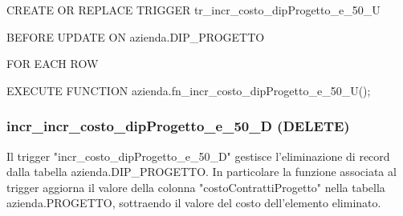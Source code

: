     \ttfamily
        \begin{flushleft}
            \begin{description}
                \item CREATE OR REPLACE TRIGGER tr\_incr\_costo\_dipProgetto\_e\_50\_U
                \item BEFORE UPDATE ON azienda.DIP\_PROGETTO
                \item FOR EACH ROW
                \item EXECUTE FUNCTION azienda.fn\_incr\_costo\_dipProgetto\_e\_50\_U();
            \end{description}
        \end{flushleft}
    \normalfont


    \subsubsection{incr\_incr\_costo\_dipProgetto\_e\_50\_D (DELETE)}
    Il trigger "incr\_costo\_dipProgetto\_e\_50\_D" gestisce l'eliminazione di record dalla tabella azienda.DIP\_PROGETTO. In particolare la funzione associata al trigger aggiorna il valore della colonna "costoContrattiProgetto" nella tabella azienda.PROGETTO, sottraendo il valore del costo dell'elemento eliminato.
    \ttfamily
